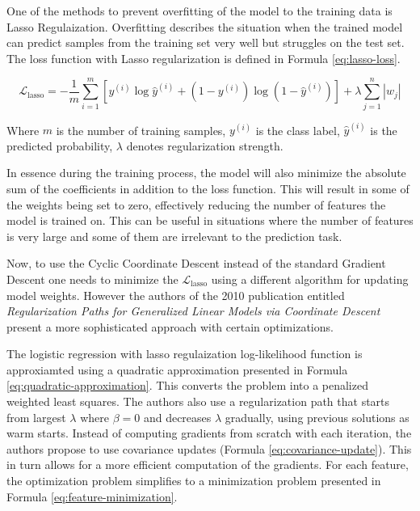 \documentclass[12pt]{article}
\begin{document}
One of the methods to prevent overfitting of the model to the training data is Lasso Regulaization. Overfitting describes the situation when the trained model can predict samples from the training set very well but struggles on the test set. The loss function with Lasso regularization is defined in Formula \ref{eq:lasso-loss}.

\begin{equation}\label{eq:lasso-loss}
\mathcal{L}_{\text{lasso}} = -\frac{1}{m} \sum_{i=1}^{m} \left[ y^{(i)} \log \hat{y}^{(i)} + \left(1 - y^{(i)}\right) \log \left(1 - \hat{y}^{(i)}\right) \right] + \lambda \sum_{j=1}^{n} |w_j|
\end{equation}

Where $m$ is the number of training samples, $y^{(i)}$ is the class label, $\hat{y}^{(i)}$ is the predicted probability, $\lambda$ denotes regularization strength.

In essence during the training process, the model will also minimize the absolute sum of the coefficients in addition to the loss function. This will result in some of the weights being set to zero, effectively reducing the number of features the model is trained on. This can be useful in situations where the number of features is very large and some of them are irrelevant to the prediction task.

Now, to use the Cyclic Coordinate Descent instead of the standard Gradient Descent one needs to minimize the $\mathcal{L}_{\text{lasso}}$ using a different algorithm for updating model weights. However the authors of the 2010 publication entitled \textit{Regularization Paths for Generalized Linear Models via Coordinate Descent} \cite{Friedman2010} present a more sophisticated approach with certain optimizations.


The logistic regression with lasso regulaization log-likelihood function is approxiamted using a quadratic approximation presented in Formula \ref{eq:quadratic-approximation}. This converts the problem into a penalized weighted least squares. The authors also use a regularization path that starts from largest $\lambda$ where $\beta = 0$ and decreases $\lambda$ gradually, using previous solutions as warm starts. Instead of computing gradients from scratch with each iteration, the authors propose to use covariance updates (Formula \ref{eq:covariance-update}). This in turn allows for a more efficient computation of the gradients. For each feature, the optimization problem simplifies to a minimization problem presented in Formula \ref{eq:feature-minimization}.
\end{document}

